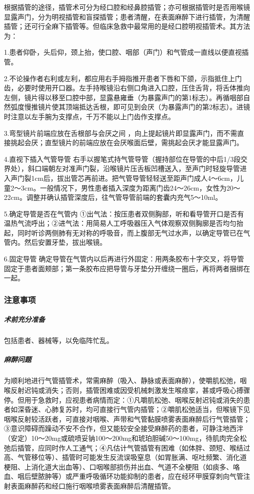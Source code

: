 根据插管的途径，插管术可分为经口腔和经鼻腔插管；亦可根据插管时是否用喉镜显露声门，分为明视插管和盲探插管；患者清醒，在表面麻醉下进行插管，为清醒插管；还可行全麻下插管等。但临床急救中最常用的是经口腔明视插管术。其方法为：

1.患者仰卧，头后仰，颈上抬，使口腔、咽部（声门）和气管成一直线以便直视插管。

2.不论操作者右利或左利，都应用右手拇指推开患者下唇和下颌，示指抵住上门齿，必要时使用开口器。左手持喉镜沿右侧口角进入口腔，压住舌背，将舌体推向左侧，镜片得以移至口腔中部，显露悬雍垂（为暴露声门的第1标志）。再循咽部自然弧度慢推镜片使其顶端抵达舌根，即可见到会厌（为暴露声门的第2标志）。进镜时注意以左手腕为支撑点，千万不能以上门齿作支撑点。

3.弯型镜片前端应放在舌根部与会厌之间
，向上提起镜片即显露声门，而不需直接挑起会厌；直型镜片的前端应放在会厌喉面后壁，需挑起会厌才能显露声门。

4.直视下插入气管导管
右手以握笔式持气管导管（握持部位在导管的中后1/3段交界处），斜口端朝左对准声门裂，沿喉镜片压舌板凹槽送入，至声门时轻旋导管进入声门裂1cm后，拔出管芯再前进。把气管导管轻轻送至距声门成人4～6cm，儿童2～3cm。一般情况下，男性患者插入深度为距离门齿24～26cm，女性为20～22cm。调整并确认插管深度后，往气管导管前端的套囊内充气5～10ml。

5.确定导管是否在气管内
①出气法：按压患者双侧胸部，听和看导管开口是否有温热气流呼出；②进气法：用简易人工呼吸器压入气体观察双侧胸廓是否均匀抬起，同时听诊两侧肺有无对称的呼吸音，而上腹部无气过水声，以确定导管已在气管内。然后安置牙垫，拔出喉镜。

6.固定导管
确定导管在气管内以后再进行外固定：用两条胶布十字交叉，将导管固定于患者面颊部；第一条胶布应把导管与牙垫分开缠绕一圈后，再将两者捆绑在一起。

\subsubsection{注意事项}

\subparagraph{术前充分准备}

包括患者、器械等，以免临阵忙乱。

\subparagraph{麻醉问题}

为顺利地进行气管插管术，常需麻醉（吸入、静脉或表面麻醉），使嚼肌松弛，咽喉反射迟钝或消失；否则，插管困难或因受机械刺激发生喉痉挛，甚或呼吸心搏骤停。但用于急救时，应视患者病情而定：①凡嚼肌松弛、咽喉反射迟钝或消失的患者如深昏迷、心肺复苏时，均可直接行气管内插管；②嚼肌松弛适当，但喉镜下见咽喉反射较活跃者，可直接对咽喉、声带和气管黏膜喷雾表面麻醉后行气管插管；③意识障碍而躁动不安不合作，但又能较安全接受麻醉药的患者，可静注地西泮（安定）10～20mg或硫喷妥钠100～200mg和琥珀胆碱50～100mg，待肌肉完全松弛后插管，应同时作人工通气；④凡估计气管插管有困难（如体胖、颈短、喉结过高、气管移位等）、插管时可能发生反流误吸窒息（如胃胀满、呕吐频繁、消化道梗阻、上消化道大出血等）、口咽喉部损伤并出血、气道不全梗阻（如痰多、咯血、咽后壁脓肿等）或严重呼吸循环功能抑制的患者，应在经环甲膜穿刺向气管注射表面麻醉药和经口施行咽喉喷雾表面麻醉后清醒插管。

